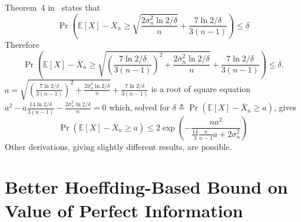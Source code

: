 \documentclass{article}
\newcommand {\IE} {\ensuremath {\mathbb{E}}}
\begin{document}
Theorem~4 in~\cite{MaurerPontil.benrstein} states that
\begin{equation}
\Pr\left(\IE[X]-\overline X_n
    \ge \sqrt { \frac {2\overline\sigma_n^2 \ln 2/\delta} n } + \frac {7 \ln 2/\delta} {3(n-1)}\right)\le \delta
\end{equation}
Therefore
\begin{equation}
\Pr\left(\IE[X]-\overline X_n \ge
              \sqrt { \left(\frac {7 \ln 2/\delta} {3(n-1)}\right)^2+\frac {2\overline\sigma_n^2 \ln 2/\delta} n }
                      + \frac {7 \ln 2/\delta} {3(n-1)}\right)
   \le \delta.
\end{equation}
$a=\sqrt { \left(\frac {7 \ln 2/\delta} {3(n-1)}\right)^2+\frac {2\overline\sigma_n^2 \ln 2/\delta} n } + \frac {7 \ln 2/\delta} {3(n-1)}$
 is a root of square equation $a^2-a\frac {14 \ln 2/\delta} {3(n-1)} -\frac {2\overline\sigma_n^2 \ln 2/\delta} n=0$
which, solved for $\delta\triangleq\Pr(\IE[X]-\overline X_n\ge a)$,
gives
\begin{equation*}
\Pr(\IE[X]-\overline X_n\ge a)\le 2\exp \left( - \frac {na^2} {\frac {14} {3} \frac {n} {n-1}a+2\overline\sigma_n^2}\right)
\end{equation*}
Other derivations, giving slightly different results, are possible.

\section{Better Hoeffding-Based Bound on Value of Perfect Information}
\label{app:better-hoeffding-bound}
\end{document}
